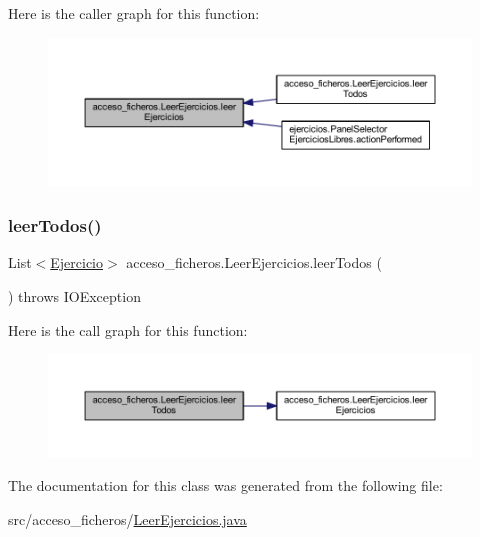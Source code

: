 Here is the caller graph for this function\+:
\nopagebreak
\begin{figure}[H]
\begin{center}
\leavevmode
\includegraphics[width=350pt]{classacceso__ficheros_1_1_leer_ejercicios_a807ed26b56826ddb590bb843b51b400b_icgraph}
\end{center}
\end{figure}
\mbox{\label{classacceso__ficheros_1_1_leer_ejercicios_ad4aa9d50306dbddf23ec64d6d483c829}} 
\subsubsection{\texorpdfstring{leer\+Todos()}{leerTodos()}}
{\footnotesize\ttfamily List$<$\mbox{\hyperlink{classclases_1_1_ejercicio}{Ejercicio}}$>$ acceso\+\_\+ficheros.\+Leer\+Ejercicios.\+leer\+Todos (\begin{DoxyParamCaption}{ }\end{DoxyParamCaption}) throws I\+O\+Exception}

Here is the call graph for this function\+:
\nopagebreak
\begin{figure}[H]
\begin{center}
\leavevmode
\includegraphics[width=350pt]{classacceso__ficheros_1_1_leer_ejercicios_ad4aa9d50306dbddf23ec64d6d483c829_cgraph}
\end{center}
\end{figure}


The documentation for this class was generated from the following file\+:\begin{DoxyCompactItemize}
\item 
src/acceso\+\_\+ficheros/\mbox{\hyperlink{_leer_ejercicios_8java}{Leer\+Ejercicios.\+java}}\end{DoxyCompactItemize}
